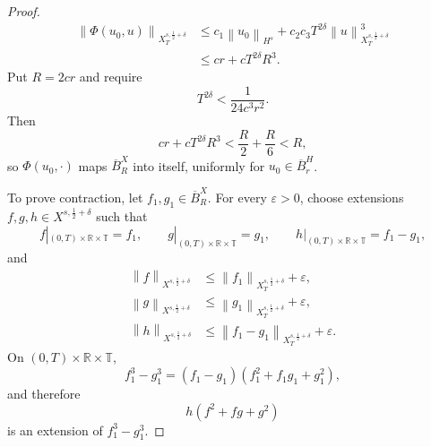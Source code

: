 \documentclass[12pt,oneside,reqno]{amsart}
\numberwithin{equation}{section}
\theoremstyle{plain}
\def\R{{\mathbb R}}
\def\T{{\mathbb T}}
\newcommand{\Hnxy}[3]{%
    \left\lVert #1\right\rVert_{H^{#2}_{#3}}%
}
\newcommand{\xnorm}[3]{%
    \left\lVert #1\right\rVert_{X^{{#2},{#3}}}%
}
\newcommand{\xtnorm}[3]{%
    \left\lVert #1\right\rVert_{X^{{#2},{#3}}_T}%
}
\newcommand{\rt}{\R\times\T}
\begin{document}
\begin{proof}
\begin{equation}
    \begin{aligned}
\xtnorm{\Phi(u_0,u)}{s}{\frac12+\delta}
&\leq
c_1\Hnxy{u_0}{s}{}
+
c_2c_3T^{2\delta}
\xtnorm{u}{s}{\frac12+\delta}^3\\
&\leq cr+cT^{2\delta}R^3.
\end{aligned}
\end{equation}
Put $R=2cr$ and require
\begin{equation}
    T^{2\delta}<\frac1{24c^3r^2}.
\end{equation}
Then
\begin{equation*}
    cr+cT^{2\delta}R^3
    <\frac R2+\frac R6<R,
\end{equation*}
so
$\Phi(u_0,\cdot)$ maps $\overline B_R^X$ into itself, uniformly for
$u_0\in\overline B_r^H$.

To prove contraction, let $f_1, g_1 \in \overline B_R^X$. For every
$\varepsilon>0$, choose extensions $f,g,h\in X^{s,\frac12+\delta}$ such that
\begin{equation}
    f|_{(0,T)\times\rt}=f_1,
    \qquad
    g|_{(0,T)\times\rt}=g_1,
    \qquad
    h|_{(0,T)\times\rt}=f_1-g_1,
\end{equation}
and
\begin{equation}
\begin{aligned}
    \xnorm{f}{s}{\frac12+\delta}
    &\leq
    \xtnorm{f_1}{s}{\frac12+\delta}
    +\varepsilon,
    \\
    \xnorm{g}{s}{\frac12+\delta}
    &\leq
    \xtnorm{g_1}{s}{\frac12+\delta}
    +\varepsilon,
    \\
    \xnorm{h}{s}{\frac12+\delta}
    &\leq
    \xtnorm{f_1-g_1}{s}{\frac12+\delta}
    +\varepsilon.
\end{aligned}
\end{equation}
On $(0,T)\times\rt$,
\begin{equation}
    f_1^3-g_1^3
    =
    (f_1-g_1)(f_1^2+f_1g_1+g_1^2),
\end{equation}
and therefore
\begin{equation}
    h(f^2+fg+g^2)
\end{equation}
is an extension of $f_1^3-g_1^3$.


\end{proof}
\end{document}
